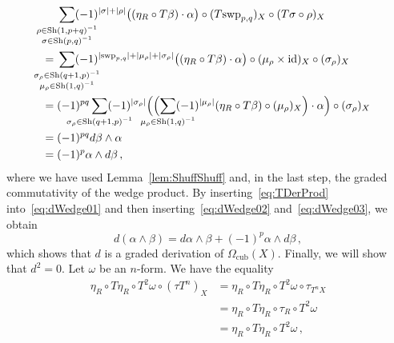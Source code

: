 \documentclass[12pt,reqno, a4paper]{amsart}
\numberwithin{equation}{section}
\theoremstyle{plain}
\theoremstyle{definition}
\theoremstyle{remark}
\DeclareMathOperator{\Shuff}{Sh}
\newcommand{\id}{\mathrm{id}}
\newcommand{\Val}{\eta}
\newcommand{\Swp}{\mathrm{swp}}
\begin{document}
\begin{equation}
\label{eq:dWedge03}
\begin{split}
  &
  \sum_{
    \mathclap{
      \substack{
        \rho \in \Shuff(1,p+q)^{-1} \\
        \sigma \in \Shuff(p,q)^{-1}
      }
    }
  }
  (-1)^{|\sigma| + |\rho|}
  \bigl((\Val_R \circ T\beta) \cdot \alpha \bigr) \circ
  (T\Swp_{p,q})_X \circ (T\sigma \circ \rho)_X
  \\
  ={}&
  \sum_{
    \mathclap{
      \substack{
        \sigma_\rho \in \Shuff(q+1,p)^{-1} \\
        \mu_\rho \in \Shuff(1,q)^{-1}
      }
    }
  }
  (-1)^{|\Swp_{p,q}|+|\mu_\rho| + |\sigma_\rho|}
  \bigl( (\Val_R \circ T\beta) \cdot \alpha \bigr) \circ
  (\mu_\rho \times \id)_X \circ (\sigma_\rho)_X
  \\
  ={}&
  (-1)^{pq}
  \sum_{\mathclap{\sigma_\rho \in \Shuff(q+1,p)^{-1}}}
  (-1)^{|\sigma_\rho|}
  \Bigl(\Bigl( \sum_{\mathclap{\mu_\rho \in \Shuff(1,q)^{-1}}} (-1)^{|\mu_\rho|}
    (\Val_R \circ T\beta) \circ (\mu_\rho)_X \Bigr)\cdot \alpha \Bigr) \circ
  (\sigma_\rho)_X
  \\
  ={}&
  (-1)^{pq}
  d\beta \wedge \alpha
  \\
  ={}&
  (-1)^p \alpha \wedge d\beta
  \,,
\end{split}
\end{equation}
where we have used Lemma~\ref{lem:ShuffShuff} and, in the last step, the graded commutativity of the wedge product. By inserting~\eqref{eq:TDerProd} into~\eqref{eq:dWedge01} and then inserting~\eqref{eq:dWedge02} and~\eqref{eq:dWedge03}, we obtain
\begin{equation*}
  d(\alpha \wedge \beta)
  =
  d\alpha \wedge \beta
    + (-1)^{p}\alpha \wedge d\beta
  \,,
\end{equation*}
which shows that $d$ is a graded derivation of $\Omega_\mathrm{cub}(X)$. Finally, we will show that $d^2 = 0$. Let $\omega$ be an $n$-form. We have the equality
\begin{equation}
\label{eq:dWedge04}
\begin{split}
  \Val_R \circ T\Val_R \circ T^2\omega \circ (\tau T^n)_X
  &=
  \Val_R \circ T\Val_R \circ T^2\omega \circ \tau_{T^n X}
  \\
  &=
  \Val_R \circ T\Val_R \circ \tau_R \circ T^2\omega
  \\
  &=
  \Val_R \circ T\Val_R \circ T^2\omega
  \,,
\end{split}
\end{equation}
\end{document}
